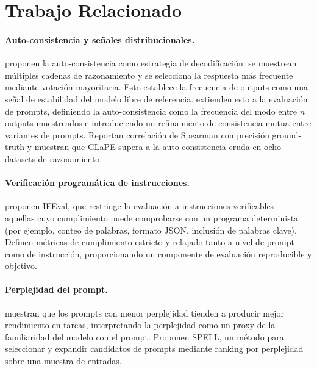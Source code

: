 \documentclass[11pt,a4paper]{article}
\begin{document}
\section{Trabajo Relacionado}

\paragraph{Auto-consistencia y señales distribucionales.}
\citet{selfconsistency2023} proponen la auto-consistencia como estrategia de decodificación: se muestrean múltiples cadenas de razonamiento y se selecciona la respuesta más frecuente mediante votación mayoritaria. Esto establece la frecuencia de outputs como una señal de estabilidad del modelo libre de referencia. \citet{glape2024} extienden esto a la evaluación de prompts, definiendo la auto-consistencia como la frecuencia del modo entre $n$ outputs muestreados e introduciendo un refinamiento de consistencia mutua entre variantes de prompts. Reportan correlación de Spearman con precisión ground-truth y muestran que GLaPE supera a la auto-consistencia cruda en ocho datasets de razonamiento.

\paragraph{Verificación programática de instrucciones.}
\citet{ifeval2023} proponen IFEval, que restringe la evaluación a instrucciones verificables ---aquellas cuyo cumplimiento puede comprobarse con un programa determinista (por ejemplo, conteo de palabras, formato JSON, inclusión de palabras clave). Definen métricas de cumplimiento estricto y relajado tanto a nivel de prompt como de instrucción, proporcionando un componente de evaluación reproducible y objetivo.

\paragraph{Perplejidad del prompt.}
\citet{promptperplexity2022} muestran que los prompts con menor perplejidad tienden a producir mejor rendimiento en tareas, interpretando la perplejidad como un proxy de la familiaridad del modelo con el prompt. Proponen SPELL, un método para seleccionar y expandir candidatos de prompts mediante ranking por perplejidad sobre una muestra de entradas.
\end{document}
